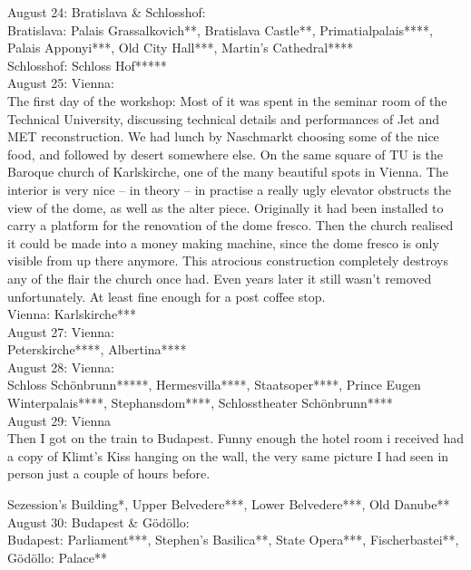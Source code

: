 August 24: Bratislava \& Schlosshof:\\
Bratislava: Palais Grassalkovich**, Bratislava Castle**, Primatialpalais****, Palais Apponyi***, Old City Hall***, Martin's Cathedral****\\
Schlosshof: Schloss Hof*****\\

August 25: Vienna:\\
The first day of the workshop: Most of it was spent in the seminar room of the Technical University, discussing technical details and performances of Jet and MET reconstruction. We had lunch by Naschmarkt choosing some of the nice food, and followed by desert somewhere else. On the same square of TU is the Baroque church of Karlskirche, one of the many beautiful spots in Vienna. The interior is very nice -- in theory -- in practise a really ugly elevator obstructs the view of the dome, as well as the alter piece. Originally it had been installed to carry a platform for the renovation of the dome fresco. Then the church realised it could be made into a money making machine, since the dome fresco is only visible from up there anymore. This atrocious construction completely destroys any of the flair the church once had. Even years later it still wasn't removed unfortunately. At least fine enough for a post coffee stop.\\

Vienna: Karlskirche***\\

August 27: Vienna:\\
Peterskirche****, Albertina****\\

August 28: Vienna:\\
Schloss Sch\"onbrunn*****, Hermesvilla****, Staatsoper****, Prince Eugen Winterpalais****, Stephansdom****, Schlosstheater Sch\"onbrunn****\\

August 29: Vienna\\
Then I got on the train to Budapest. Funny enough the hotel room i received had a copy of Klimt's Kiss hanging on the wall, the very same picture I had seen in person just a couple of hours before.

Sezession's Building*, Upper Belvedere***, Lower Belvedere***, Old Danube**\\

August 30: Budapest \& G\"od\"ollo:\\
Budapest: Parliament***, Stephen's Basilica**, State Opera***, Fischerbastei**, G\"od\"ollo: Palace**\\

